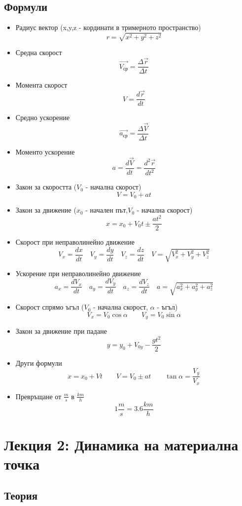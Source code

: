 \documentclass[fleqn, 12pt]{article}
\theoremstyle{definition}
\begin{document}
\newpage
\subsection{Формули}

\begin{itemize}
\item Радиус вектор (x,y,z - кординати в тримерното пространство)
$$r= \sqrt{x^2 + y^2 + z^2}$$
\item Средна скорост
$$\vec{V_{\text{ср}}} = \frac{\Delta \vec{r}}{\Delta t}$$
\item Момента скорост
$$V = \frac{d\vec{r}}{dt}$$
\item Средно ускорение
$$\vec{a_{\text{ср}}} = \frac{\Delta \vec{V}}{\Delta t} $$
\item Моменто ускорение
$$a = \frac{d\vec{V}}{dt} = \frac{d^2 \vec{r}}{dt^2}$$
\item Закон за скоростта ($V_0$ - начална скорост)
$$V = V_0 + at$$
\item Закон за движение ($x_0$ - начален път,$V_0$ - начална скорост)
$$x = x_0 + V_0t \pm \frac{at^2}{2}$$
\item Скорост при неправолинейно движение
$$V_x = \frac{dx}{dt} \quad V_y = \frac{dy}{dt} \quad V_z = \frac{dz}{dt} \quad V = \sqrt{V_x^2 + V_y^2 + V_z^2}$$
\item Ускорение при неправолинейно движение
$$a_x = \frac{dV_x}{dt} \quad a_y = \frac{dV_y}{dt} \quad a_z = \frac{dV_z}{dt}  \quad a = \sqrt{a_x^2 + a_y^2 + a_z^2}$$
\item Скорост спрямо ъгъл ($V_0$ - начална скорост, $\alpha$ - ъгъл)
$$V_x = V_0 \cos \alpha \qquad V_y = V_0 \sin \alpha$$
\item Закон за движение при падане
$$y = y_0 + V_{0y} - \frac{gt^2}{2} $$
\item Други формули
$$x = x_0 + Vt \qquad V = V_0 \pm at \qquad \tan \alpha = \frac{V_y}{V_x}$$
\item Превръщане от $\frac{m}{s}$ в $\frac{km}{h}$ 
$$1 \frac{m}{s} = 3.6 \frac{km}{h}$$
\end{itemize}

\newpage
\section{Лекция 2: Динамика на материална точка}

\subsection{Теория}
\end{document}
